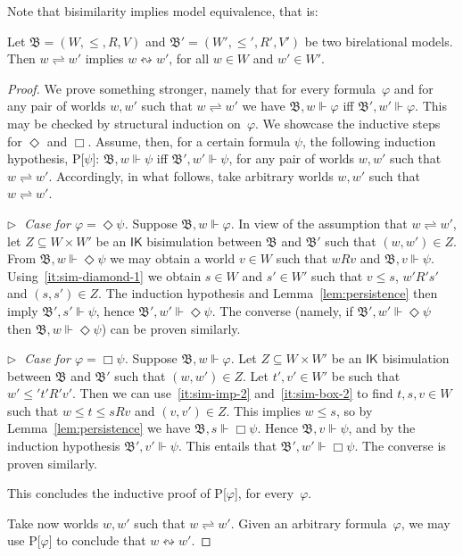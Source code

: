 \documentclass[submission,copyright,creativecommons]{eptcs}
\newcommand{\mo}{\mathfrak}
\newcommand{\B}{\mo{B}}
\newcommand{\ac}{R}
\newcommand{\bisim}{\rightleftharpoons}
\newcommand{\logeq}{\leftrightsquigarrow}
\renewcommand{\phi}{\varphi}
\newcommand{\IK}{\mathsf{IK}}
\begin{document}
Note that bisimilarity implies model equivalence, that is:

\begin{proposition}\label{prop:adeq}
  Let $\B = (W, \leq, \ac, V)$ and $\B' = (W', \leq', \ac', V')$ be two
  birelational models. Then $w \bisim w'$ implies $w \logeq w'$,
  for all $w \in W$ and $w' \in W'$.
\end{proposition}
\begin{proof}
  We prove something stronger, namely that for every formula~$\varphi$ and for any pair of worlds $w, w'$ such that $w\bisim w'$ we have $\B,w\Vdash \varphi$ iff $\B',w'\Vdash \varphi$.  
  This may be checked by structural induction on~$\varphi$.
  We showcase the inductive steps for $\Diamond$ and $\Box$.  
  Assume, then, for a certain formula $\psi$, the following induction hypothesis,  P[$\psi$]: $\B,w\Vdash \psi$ iff $\B',w'\Vdash \psi$, for any pair of worlds $w, w'$ such that $w\bisim w'$.
  Accordingly, in what follows, take arbitrary worlds $w, w'$ such that $w \bisim w'$.  
  
  \medskip\noindent
  \textit{$\triangleright\;$ Case for $\phi = \Diamond\psi$.} Suppose $\B, w \Vdash \phi$.
  In view of the assumption that $w \bisim w'$, let $Z \subseteq W \times W'$ be an $\IK$ bisimulation
  between $\B$ and $\B'$ such that $(w, w') \in Z$.
  From $\B, w \Vdash \Diamond\psi$ we may obtain a world $v \in W$
  such that $w \ac v$ and $\B, v \Vdash \psi$. Using~\eqref{it:sim-diamond-1}
  we obtain $s \in W$ and $s' \in W'$ such that $v \leq s$, $w'\ac's'$ and $(s,s') \in Z$. The induction hypothesis and Lemma~\ref{lem:persistence}
  then imply $\B', s' \Vdash \psi$, hence $\B', w' \Vdash \Diamond\psi$.
  The converse (namely, if $\B', w' \Vdash \Diamond\psi$ then $\B, w \Vdash \Diamond\psi$)
  can be proven similarly.

  \medskip\noindent
  \textit{$\triangleright\;$ Case for $\phi = \Box\psi$.} Suppose $\B, w \Vdash \phi$.
  Let $Z \subseteq W \times W'$ be an $\IK$ bisimulation between $\B$ and $\B'$ such that $(w, w') \in Z$.
  Let $t', v' \in W'$ be such that $w' \leq' t' \ac' v'$.
  Then we can use~\eqref{it:sim-imp-2} and~\eqref{it:sim-box-2} to find
  $t, s, v \in W$ such that $w \leq t \leq s \ac v$ and $(v, v') \in Z$.
  This implies $w \leq s$, so by Lemma~\ref{lem:persistence} we have $\B, s \Vdash \Box\psi$.
  Hence $\B, v \Vdash \psi$, and by the induction hypothesis
  $\B', v' \Vdash \psi$. This entails that $\B', w' \Vdash \Box\psi$.
  The converse is proven similarly.

  This concludes the inductive proof of P[$\varphi$], for every~$\varphi$.

  Take now worlds $w, w'$ such that $w \bisim w'$.  Given an arbitrary formula~$\varphi$, we may use P[$\varphi$] to conclude that $w \logeq w'$.
\end{proof}
\end{document}
